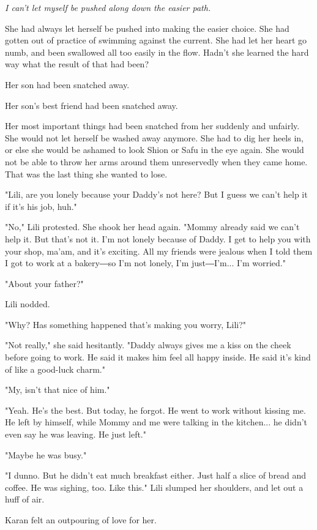 \emph{I can't let myself be pushed along down the easier path.}

She had always let herself be pushed into making the easier choice. She
had gotten out of practice of swimming against the current. She had let
her heart go numb, and been swallowed all too easily in the flow. Hadn't
she learned the hard way what the result of that had been?

Her son had been snatched away.

Her son's best friend had been snatched away.

Her most important things had been snatched from her suddenly and
unfairly. She would not let herself be washed away anymore. She had to
dig her heels in, or else she would be ashamed to look Shion or Safu in
the eye again. She would not be able to throw her arms around them
unreservedly when they came home. That was the last thing she wanted to
lose.

"Lili, are you lonely because your Daddy's not here? But I guess we
can't help it if it's his job, huh."

"No," Lili protested. She shook her head again. "Mommy already said we
can't help it. But that's not it. I'm not lonely because of Daddy. I get
to help you with your shop, ma'am, and it's exciting. All my friends
were jealous when I told them I got to work at a bakery―so I'm not
lonely, I'm just―I'm... I'm worried."

"About your father?"

Lili nodded.

"Why? Has something happened that's making you worry, Lili?"

"Not really," she said hesitantly. "Daddy always gives me a kiss on the
cheek before going to work. He said it makes him feel all happy inside.
He said it's kind of like a good-luck charm."

"My, isn't that nice of him."

"Yeah. He's the best. But today, he forgot. He went to work without
kissing me. He left by himself, while Mommy and me were talking in the
kitchen... he didn't even say he was leaving. He just left."

"Maybe he was busy."

"I dunno. But he didn't eat much breakfast either. Just half a slice of
bread and coffee. He was sighing, too. Like this." Lili slumped her
shoulders, and let out a huff of air.

Karan felt an outpouring of love for her.

